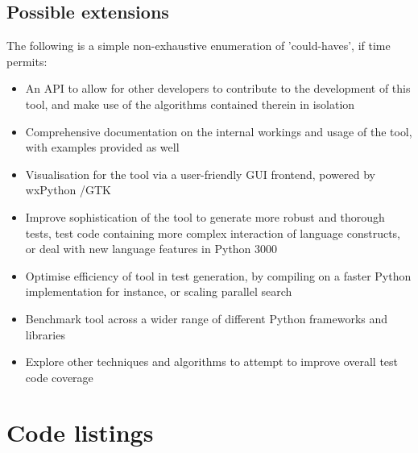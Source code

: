 \documentclass{icldt}
\numberwithin{equation}{section}       %
\begin{document}
\section{Possible extensions}

The following is a simple non-exhaustive enumeration of 'could-haves', if time permits:
\begin{itemize}
	\item An API to allow for other developers to contribute to the development of this tool, and make use of the algorithms contained therein in isolation
	\item Comprehensive documentation on the internal workings and usage of the tool, with examples provided as well
	\item Visualisation for the tool via a user-friendly GUI frontend, powered by wxPython /GTK
	\item Improve sophistication of the tool to generate more robust and thorough tests, test code containing more complex interaction of language constructs, or deal with new language features in Python 3000
	\item Optimise efficiency of tool in test generation, by compiling on a faster Python implementation for instance, or scaling parallel search
	\item Benchmark tool across a wider range of different Python frameworks and libraries
	\item Explore other techniques and algorithms to attempt to improve overall test code coverage
\end{itemize}

\nocite{*}
\appendix
\chapter{Code listings}

\end{document}
